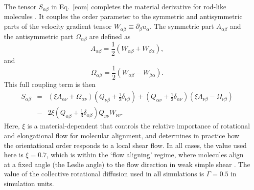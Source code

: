 \documentclass[12pt]{article}
\begin{document}
The tensor $S_{\alpha\beta}$ in Eq.~\ref{eom} completes the material
derivative for rod-like molecules \cite{beris}. It couples the order
parameter to the symmetric and antisymmetric parts of the velocity 
gradient tensor $W_{\alpha \beta}\equiv\partial_\beta u_\alpha$.
The symmetric part $A_{\alpha\beta}$ and the antisymmetric part
$\Omega_{\alpha\beta}$ are defined as 
\begin{equation}
A_{\alpha\beta} = {\textstyle \frac{1}{2}} (W_{\alpha\beta} + W_{\beta\alpha}),
\end{equation}
and
\begin{equation}
\Omega_{\alpha\beta} = {\textstyle \frac{1}{2}} (W_{\alpha\beta} - W_{\beta\alpha}).
\end{equation}
This full coupling term is then
\begin{eqnarray}
\label{coupling-term}
S_{\alpha\beta}  &=&
(\xi A_{\alpha\nu} + \Omega_{\alpha\nu})
(Q_{\nu\beta} + {\textstyle \frac{1}{3}}\delta_{\nu\beta})
+
(Q_{\alpha\nu} + {\textstyle \frac{1}{3}} \delta_{\alpha\nu})
(\xi A_{\nu\beta} - \Omega_{\nu\beta})
\nonumber\\ 
&-&2 \xi ({Q_{\alpha\beta} + {\textstyle \frac{1}{3}}\delta_{\alpha\beta}})
Q_{\nu\nu} W_{\nu\nu}.
\end{eqnarray}
Here, $\xi$ is a material-dependent that controls the
relative importance of rotational and elongational flow for molecular
alignment, and determines in practice how the orientational order
responds to a local shear flow. 
In all cases, the value used here is $\xi = 0.7$, which is within
the `flow aligning' regime, where molecules align at a fixed angle
(the Leslie angle) to the flow direction in weak simple shear \cite{deGennes}.
The value of the collective rotational diffusion used in all simulations is
$\mathit{\Gamma} = 0.5$ in simulation units.
\end{document}
